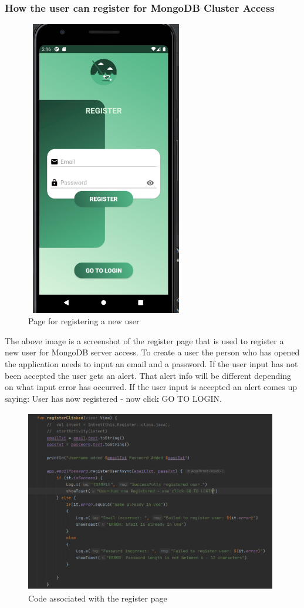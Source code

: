 \subsubsection{How the user can register for MongoDB Cluster Access}
\begin{figure}[H]
    \centering
    \includegraphics[width=7cm, height = 13cm]{img/registerPage.PNG}
    \caption{Page for registering a new user}
    \label{fig:Page for registering a new user}
\end{figure}
\newpage
The above image is a screenshot of the register page that is used to register a new user for MongoDB server access. To create a user the person who has opened the application needs to input an email and a password. If the user input has not been accepted the user gets an alert. That alert info will be different depending on what input error has occurred. If the user input is accepted an alert comes up saying: User has now registered - now click GO TO LOGIN.
\begin{figure}[H]
    \centering
    \includegraphics[width=11cm, height= 8cm]{img/registerCode.PNG}
    \caption{Code associated with the register page}
    \label{fig:Code associated with the register page}
\end{figure}
